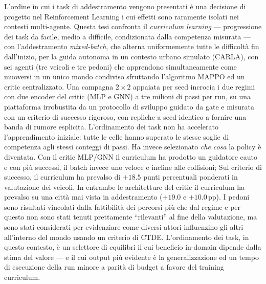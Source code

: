 \documentclass[12pt,a4paper,oneside]{report}
\begin{document}
\clearpage
\null\vfil
{}
{}
\begin{center}%
  \bfseries \abstractname
\end{center}
L'ordine in cui i task di addestramento vengono presentati è una
decisione di progetto nel Reinforcement Learning i cui effetti sono
raramente isolati nei contesti multi-agente. Questa tesi confronta il
\emph{curriculum learning} --- progressione dei task da facile, medio 
a difficile, condizionata dalla competenza misurata --- con l'addestramento
\emph{mixed-batch}, che alterna uniformemente tutte le difficoltà fin dall'inizio, 
per la guida autonoma in un contesto urbano simulato (CARLA), con sei agenti 
(tre veicoli e tre pedoni) che apprendono simultaneamente come muoversi in un unico 
mondo condiviso sfruttando l'algoritmo MAPPO ed un critic centralizzato. 
Una campagna $2\times2$ appaiata per seed incrocia i due regimi con due encoder 
del critic (MLP e GNN) a tre milioni di passi per run, su una piattaforma irrobustita 
da un protocollo di sviluppo guidato da gate e misurata con un criterio di successo
rigoroso, con repliche a seed identico a fornire una banda di rumore esplicita.
L'ordinamento dei task non ha accelerato l'apprendimento iniziale: tutte
le celle hanno superato le stesse soglie di competenza agli stessi
conteggi di passi. Ha invece selezionato \emph{che cosa} la policy è
diventata. Con il critic MLP/GNN il curriculum ha prodotto un guidatore
cauto e con più successi, il batch invece uno veloce e incline alle collisioni;
Sul criterio di successo, il curriculum ha prevalso di $+18.5$ punti percentuali ponderati
in valutazione dei veicoli. In entrambe le architetture del critic il curriculum ha prevalso su una città
mai vista in addestramento ($+19.0$ e $+10.0$\,pp). 
I pedoni sono risultati vincolati dalla fattibilità dei percorsi più che dal regime e per questo 
non sono stati tenuti prettamente \enquote{rilevanti} al fine della valutazione, ma sono stati considerati per
evidenziare come diversi attori influenzino gli altri all'interno del mondo usando un criterio di CTDE. 
L'ordinamento dei task, in questo contesto, è un selettore di equilibri il cui beneficio
in-domain dipende dalla stima del valore --- e il cui output più evidente è la generalizzazione ed un tempo di 
esecuzione della run minore a parità di budget a favore del training curriculum.
\par\vfil\null

\tableofcontents
\end{document}
